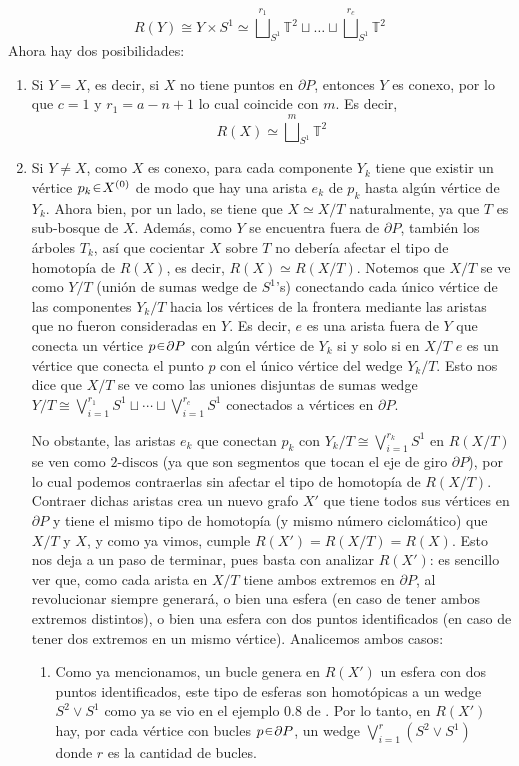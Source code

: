 \begin{sol}
\[
R(Y) \cong Y \times S^1 \simeq {\bigsqcup^{r_1}}_{S^1} \mathbb{T}^2 \sqcup \dots \sqcup {\bigsqcup^{r_c}}_{S^1} \mathbb{T}^2
\]
Ahora hay dos posibilidades:
\begin{enumerate}[leftmargin=*]
\item Si $Y = X$, es decir, si $X$ no tiene puntos en $\partial P$, entonces $Y$ es conexo, por lo que $c=1$ y $r_1 = a - n+1$ lo cual coincide con $m$. Es decir,
\[
R(X) \simeq {\bigsqcup^{m}}_{S^1} \mathbb{T}^2
\]

\item Si $Y \neq X$, como $X$ es conexo, para cada componente $Y_k$ tiene que existir un vértice $p_k \en X^{(0)}$ de modo que hay una arista $e_k$ de $p_k$ hasta algún vértice de $Y_k$. Ahora bien, por un lado, se tiene que $X \simeq X/T$ naturalmente, ya que $T$ es sub-bosque de $X$. Además, como $Y$ se encuentra fuera de $\partial P$, también los árboles $T_k$, así que cocientar $X$ sobre $T$ no debería afectar el tipo de homotopía de $R(X)$, es decir, $R(X) \simeq R(X/T)$. Notemos que $X/T$ se ve como $Y/T$ (unión de sumas wedge de $S^1$'s) conectando cada único vértice de las componentes $Y_k/T$ hacia los vértices de la frontera mediante las aristas que no fueron consideradas en $Y$. Es decir, $e$ es una arista fuera de $Y$ que conecta un vértice $p\en \partial P$ con algún vértice de $Y_k$ si y solo si en $X/T$ $e$ es un vértice que conecta el punto $p$ con el único vértice del wedge $Y_k/T$. Esto nos dice que $X/T$ se ve como las uniones disjuntas de sumas wedge $Y/T \cong \bigvee^{r_1}_{i=1}S^1 \sqcup \cdots \sqcup \bigvee^{r_c}_{i=1}S^1$ conectados a vértices en $\partial P$.\par

No obstante, las aristas $e_k$ que conectan $p_k$ con $Y_k/T \cong \bigvee^{r_k}_{i=1}S^1$ en $R(X/T)$ se ven como $2\text{-discos}$ (ya que son segmentos que tocan el eje de giro $\partial P$), por lo cual podemos contraerlas sin afectar el tipo de homotopía de $R(X/T)$. Contraer dichas aristas crea un nuevo grafo $X'$ que tiene todos sus vértices en $\partial P$ y tiene el mismo tipo de homotopía (y mismo número ciclomático) que $X/T$ y $X$, y como ya vimos, cumple $R(X') = R(X/T) = R(X)$. Esto nos deja a un paso de terminar, pues basta con analizar $R(X')$: es sencillo ver que, como cada arista en $X/T$ tiene ambos extremos en $\partial P$, al revolucionar siempre generará, o bien una esfera (en caso de tener ambos extremos distintos), o bien una esfera con dos puntos identificados (en caso de tener dos extremos en un mismo vértice). Analicemos ambos casos:
    \begin{enumerate}[leftmargin=1.2em, label=(\roman*)]
    \item Como ya mencionamos, un bucle genera en $R(X')$ un esfera con dos puntos identificados, este tipo de esferas son homotópicas a un wedge $S^2 \vee S^1$ como ya se vio en el ejemplo 0.8 de \cite[p. 11]{hatcher2002algebraic}. Por lo tanto, en $R(X')$ hay, por cada vértice con bucles $p \en \partial P$, un wedge $\bigvee^r_{i=1} (S^2 \vee S^1)$ donde $r$ es la cantidad de bucles.
    

\end{enumerate}
\end{enumerate}
\end{sol}
